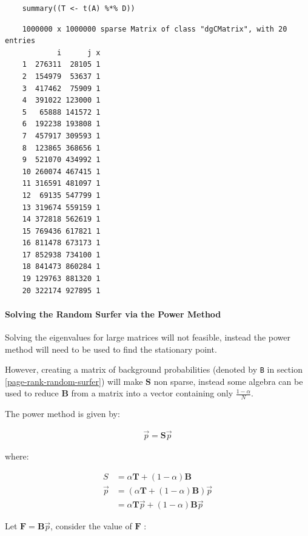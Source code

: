 \documentclass[11pt]{report}
\begin{document}
\begin{tcolorbox}
    \begin{verbatim}
    summary((T <- t(A) %*% D))
    \end{verbatim}
\tcblower
    \begin{verbatim}
    1000000 x 1000000 sparse Matrix of class "dgCMatrix", with 20 entries
            i      j x
    1  276311  28105 1
    2  154979  53637 1
    3  417462  75909 1
    4  391022 123000 1
    5   65888 141572 1
    6  192238 193808 1
    7  457917 309593 1
    8  123865 368656 1
    9  521070 434992 1
    10 260074 467415 1
    11 316591 481097 1
    12  69135 547799 1
    13 319674 559159 1
    14 372818 562619 1
    15 769436 617821 1
    16 811478 673173 1
    17 852938 734100 1
    18 841473 860284 1
    19 129763 881320 1
    20 322174 927895 1
    \end{verbatim}
\end{tcolorbox}

\paragraph{Solving the Random Surfer via the Power Method}
\label{random-surfer-sparse-fix}
Solving the eigenvalues for large matrices will not feasible, instead the power method will need to be used to find the stationary point.

However, creating a matrix of background probabilities (denoted by \texttt{B} in section \ref{page-rank-random-surfer}) will make \(\mathbf{S}\)  non sparse, instead some algebra can be used to reduce \(\mathbf{B}\) from a matrix into a vector containing only \(\frac{1-\alpha}{N}\).

The power method is given by:

\begin{align}
\vec{p}= \mathbf{S} \vec{p}
\end{align}

where:

\begin{align}
S &= \alpha \mathbf{T} +  \left( 1 - \alpha \right) \mathbf{B} \\
\vec{p} &= \left( \alpha \mathbf{T} +  \left( 1 - \alpha \right) \mathbf{B} \right) \vec{p}\\
&= \alpha \mathbf{T}\vec{p} +  \left( 1-\alpha \right) \mathbf{B} \vec{p}
\end{align}

Let \(\mathbf{F}= \mathbf{B}\vec{p}\), consider the value of \(\mathbf{F}\) :
\end{document}
